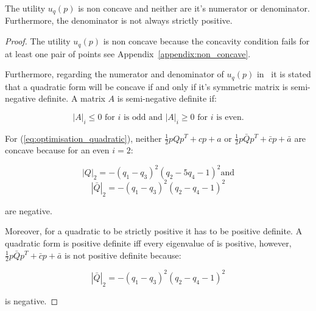 The utility \(u_q(p)\) is non concave and neither are it's numerator or
denominator. Furthermore, the denominator is not always strictly positive.

\begin{proof}

The utility \(u_q(p)\) is non concave because the concavity condition fails for at
least one pair of points see Appendix~\ref{appendix:non_concave}.

Furthermore, regarding the numerator and denominator of \(u_q(p)\)
in~\cite{Anton2014} it is stated that a quadratic form will be concave if and
only if it's symmetric matrix is semi-negative definite. A matrix \(A\) is
semi-negative definite if:

\begin{equation}\label{def:semi_negative}
|A|_i \leq 0 \text{ for } i \text{ is odd and } |A|_i \geq 0  \text{ for } i
\text{ is even.}
\end{equation}

For (\ref{eq:optimisation_quadratic}), neither \(\frac{1}{2}pQp^T + cp + a\)
or \(\frac{1}{2}p\bar{Q}p^T + \bar{c}p + \bar{a}\) are concave because for an even \(i=2\):

\[|Q|_2 = - \left(q_{1} - q_{3}\right)^{2} \left(q_{2} - 5 q_{4} - 1\right)^{2} \text{and}\]
\[|\bar{Q}|_2 =- \left(q_{1} - q_{3}\right)^{2} \left(q_{2} - q_{4} - 1\right)^{2}\]

are negative.

Moreover, for a quadratic to be strictly positive it has to be positive definite.
A quadratic form is positive definite iff every eigenvalue of is positive,
however, \(\frac{1}{2}p\bar{Q}p^T + \bar{c}p + \bar{a}\) is not positive definite
because:

\[|\bar{Q}|_2 =- \left(q_{1} - q_{3}\right)^{2} \left(q_{2} - q_{4} - 1\right)^{2}\]

is negative.
\end{proof}